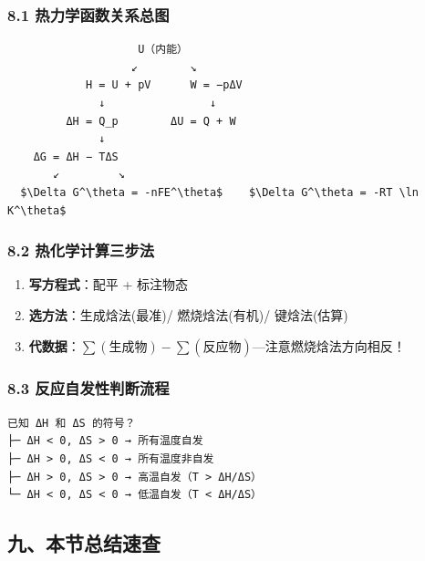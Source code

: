 \subsubsection{8.1 热力学函数关系总图}\label{ux70edux529bux5b66ux51fdux6570ux5173ux7cfbux603bux56fe}

\begin{verbatim}
                    U（内能）
                   ↙        ↘
            H = U + pV      W = −pΔV
              ↓                ↓
         ΔH = Q_p        ΔU = Q + W
              ↓
    ΔG = ΔH − TΔS
       ↙         ↘
  $\Delta G^\theta = -nFE^\theta$    $\Delta G^\theta = -RT \ln K^\theta$
\end{verbatim}

\subsubsection{8.2 热化学计算三步法}\label{ux70edux5316ux5b66ux8ba1ux7b97ux4e09ux6b65ux6cd5}

\begin{enumerate}
\def\labelenumi{\arabic{enumi}.}
\tightlist
\item
  \textbf{写方程式}：配平 + 标注物态
\item
  \textbf{选方法}：生成焓法(最准)/ 燃烧焓法(有机)/ 键焓法(估算)
\item
  \textbf{代数据}：\(\sum(\text{生成物}) - \sum(\text{反应物})\)---注意燃烧焓法方向相反！
\end{enumerate}

\subsubsection{8.3 反应自发性判断流程}\label{ux53cdux5e94ux81eaux53d1ux6027ux5224ux65adux6d41ux7a0b}

\begin{verbatim}
已知 ΔH 和 ΔS 的符号？
├─ ΔH < 0, ΔS > 0 → 所有温度自发
├─ ΔH > 0, ΔS < 0 → 所有温度非自发
├─ ΔH > 0, ΔS > 0 → 高温自发（T > ΔH/ΔS）
└─ ΔH < 0, ΔS < 0 → 低温自发（T < ΔH/ΔS）
\end{verbatim}

\subsection{九、本节总结速查}\label{ux4e5dux672cux8282ux603bux7ed3ux901fux67e5}

